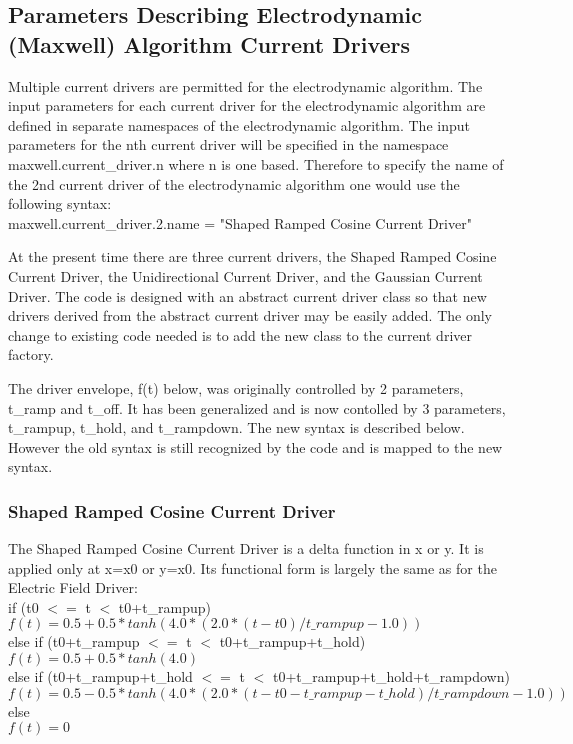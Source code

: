 \documentclass[11pt]{amsart}
\begin{document}
\subsection*{Parameters Describing Electrodynamic (Maxwell) Algorithm Current Drivers}
Multiple current drivers are permitted for the electrodynamic algorithm.  The
input parameters for each current driver for the electrodynamic algorithm are
defined in separate namespaces of the electrodynamic algorithm.  The input
parameters for the nth current driver will be specified in the namespace
maxwell.current\_driver.n where n is one based.  Therefore to specify the name
of the 2nd current driver of the electrodynamic algorithm one would use the
following syntax: \\
maxwell.current\_driver.2.name = "Shaped Ramped Cosine Current Driver"

At the present time there are three current drivers, the Shaped Ramped Cosine
Current Driver, the Unidirectional Current Driver, and the Gaussian Current
Driver.  The code is designed with an abstract current driver class so that new
drivers derived from the abstract current driver may be easily added.  The only
change to existing code needed is to add the new class to the current driver
factory.

The driver envelope, f(t) below, was originally controlled by 2 parameters,
t\_ramp and t\_off.  It has been generalized and is now contolled by 3
parameters, t\_rampup, t\_hold, and t\_rampdown.  The new syntax is described
below.  However the old syntax is still recognized by the code and is mapped to
the new syntax.

\subsubsection*{Shaped Ramped Cosine Current Driver}
The Shaped Ramped Cosine Current Driver is a delta function in x or y.  It is
applied only at x=x0 or y=x0.  Its functional form is largely the same as for
the Electric Field Driver: \\
\noindent if (t0 $<=$ t $<$ t0+t\_rampup) \\
\indent \begin{math} f(t) = 0.5+0.5*tanh(4.0*(2.0*(t-t0)/t\_rampup-1.0)) \end{math} \\
else if (t0+t\_rampup $<=$ t $<$ t0+t\_rampup+t\_hold) \\
\indent \begin{math} f(t) = 0.5+0.5*tanh(4.0) \end{math} \\
else if (t0+t\_rampup+t\_hold $<=$ t $<$ t0+t\_rampup+t\_hold+t\_rampdown) \\
\indent \begin{math} f(t) = 0.5-0.5*tanh(4.0*(2.0*(t-t0-t\_rampup-t\_hold)/t\_rampdown-1.0)) \end{math} \\
else \\
\indent \begin{math} f(t) = 0 \end{math}
\end{document}
